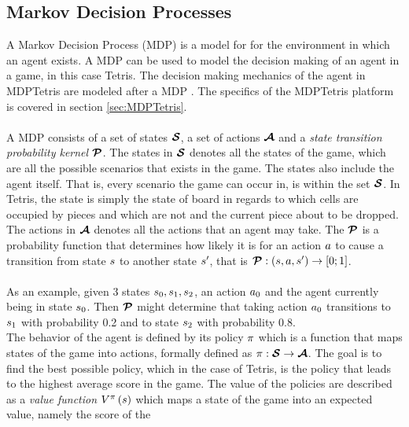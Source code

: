 \subsection{Markov Decision Processes \label{MDP}}

A Markov Decision Process (MDP) is a model for for the environment 
in which an agent exists. A MDP can be used to model the decision making
of an agent in a game, in this case Tetris. 
The decision making mechanics of the agent in MDPTetris are modeled
after a MDP \citep{mdptetris}. The specifics of the 
MDPTetris platform is covered in section \ref{sec:MDPTetris}.\\
\\
A MDP consists of a set of states $\boldsymbol{\mathcal{S}}$,
a set of actions $\boldsymbol{\mathcal{A}}$ and a 
\textit{state transition probability kernel} $\boldsymbol{\mathcal{P}}$.
The states in $\boldsymbol{\mathcal{S}}$ denotes all the states of the game, 
which are all the possible scenarios that exists in the
game. The states also include the agent itself. That is, every scenario
the game can occur in, is within the set $\boldsymbol{\mathcal{S}}$. 
In Tetris, the state is simply the
state of board in regards to which cells are
occupied by pieces and which are not and the 
current piece about to be dropped.
The actions in $\boldsymbol{\mathcal{A}}$
denotes all the actions that an agent may take. The $\boldsymbol{\mathcal{P}}$ is
a probability function that determines how likely it is for an action $a$
to cause a transition from state $s$ to another state $s^\prime$, that is 
$\boldsymbol{\mathcal{P}} : \left( s, a, s^\prime \right) \rightarrow [0;1]$.\\\\
As an example, given 3 states 
$s_0, s_1, s_2$, an action $a_0$ and the 
agent currently being in state $s_0$. Then $\boldsymbol{\mathcal{P}}$
might determine that taking action $a_0$ transitions
to $s_1$ with probability 0.2 and to state $s_2$
with probability 0.8. \\
The behavior of the agent is defined by its policy $\pi$
which is a function that maps states of the game into actions, formally
defined as $\pi : \boldsymbol{\mathcal{S}} \rightarrow \boldsymbol{\mathcal{A}}$.
The goal is to find the best possible policy, which in the case
of Tetris, is the policy that leads to the highest average score
in the game. The value of the policies are described as a 
\textit{value function} 
$V^{\pi}\left( s  \right)$ 
which maps a state
of the game into an expected value, namely the score of the 
